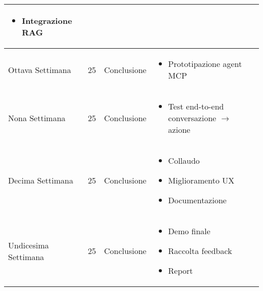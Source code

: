 \begin{table}[h]
\begin{tabular}{@{}l c l X@{}}
{    \begin{itemize}
    \item Integrazione RAG
    \end{itemize}} \\
    \midrule
Ottava Settimana & 25 & Conclusione & \multicolumn{1}{X}{%
    \begin{itemize}
    \item Prototipazione agent MCP
    \end{itemize}} \\
    \midrule
Nona Settimana & 25 & Conclusione & \multicolumn{1}{X}{%
    \begin{itemize}
    \item Test end-to-end conversazione $\rightarrow$ azione
    \end{itemize}} \\
    \midrule
Decima Settimana & 25 & Conclusione & \multicolumn{1}{X}{%
    \begin{itemize}
    \item Collaudo
    \item Miglioramento UX
    \item Documentazione
    \end{itemize}} \\
    \midrule
Undicesima Settimana & 25 & Conclusione & \multicolumn{1}{X}{%
    \begin{itemize}
    \item Demo finale
    \item Raccolta feedback
    \item Report
    \end{itemize}} \\

\bottomrule
\end{tabular}
\end{table}


